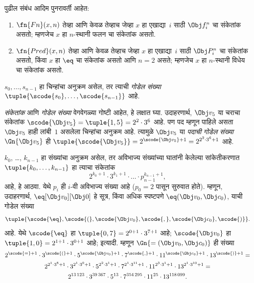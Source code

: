 \begin{prop}
पुढील संबंध आदिम पुनरावर्ती आहेत:
\begin{enumerate}
\item $\fn{Fn}(x, n)$ तेव्हा आणि केवळ तेव्हाच जेव्हा $x$ हा एखाद्या~$i$ साठी
  $\Obj f^n_i$ चा संकेतांक असतो; म्हणजेच $x$ हा $n$-स्थानी
  फलन चा संकेतांक असतो.
\item $\fn{Pred}(x, n)$ तेव्हा आणि केवळ तेव्हाच जेव्हा $x$ हा एखाद्या~$i$ साठी
  $\Obj P^n_i$ चा संकेतांक असतो, किंवा $x$ हा $\eq$ चा संकेतांक
  असतो आणि $n = 2$ असते; म्हणजेच $x$ हा $n$-स्थानी विधेय
  चा संकेतांक असतो.
\end{enumerate}
\end{prop}

\begin{defn}
$s_0, \dots, s_{n-1}$ हा चिन्हांचा अनुक्रम असेल, तर त्याची
\emph{गोडेल संख्या} $\tuple{\scode{s_0}, \dots, \scode{s_{n-1}}}$ आहे.
\end{defn}

\begin{explain}
\emph{संकेतांक} आणि \emph{गोडेल संख्या} वेगवेगळ्या गोष्टी आहेत,
हे लक्षात घ्या. उदाहरणार्थ, $\Obj v_5$ या चराचा संकेतांक
$\scode{\Obj v_5} = \tuple{1, 5} = 2^2\cdot 3^6$ आहे.
पण पद म्हणून पाहिले असता~$\Obj v_5$ हाही लांबी~$1$ असलेला
चिन्हांचा अनुक्रम आहे. त्यामुळे $\Obj v_5$ या \emph{पदाची}
\emph{गोडेल संख्या}~$\Gn{\Obj v_5}$ ही
$\tuple{\scode{\Obj v_5}} = 2^{\scode{\Obj v_5} + 1} =
2^{2^2\cdot 3^6 + 1}$ आहे.
\end{explain}

\begin{ex}
$k_0$, \dots, $k_{n-1}$ हा संख्यांचा अनुक्रम असेल, तर
अविभाज्य संख्यांच्या घातांनी केलेल्या सांकेतीकरणात
$\tuple{k_0, \dots, k_{n-1}}$ हा त्याचा संकेतांक
\[2^{k_0+1}\cdot3^{k_1+1}\cdot \dots \cdot p_{n-1}^{k_{n-1}+1},
\]
आहे, हे आठवा. येथे $p_i$ ही $i$-वी अविभाज्य संख्या आहे
($p_0 = 2$ पासून सुरुवात होते). म्हणून, उदाहरणार्थ,
$\eq[\Obj v_0][\Obj 0]$ हे सूत्र, किंवा अधिक स्पष्टपणे
${\eq}(\Obj v_0,\Obj c_0)$, याची गोडेल संख्या
\[\tuple{\scode{\eq},\scode{(},\scode{\Obj v_0},\scode{,}, \scode{\Obj
    c_0},\scode{)}}.
\]
आहे. येथे $\scode{\eq}$ हा $\tuple{0,7} = 2^{0+1}\cdot
3^{7+1}$ आहे; $\scode{\Obj v_0}$ हा $\tuple{1,0} = 2^{1+1}\cdot3^{0+1}$
आहे; इत्यादी. म्हणून $\Gn{=(\Obj v_0,\Obj c_0)}$ ही संख्या
\begin{multline*}
2^{\scode{=} + 1}\cdot 3^{\scode{(}+1}\cdot 5^{\scode{\Obj v_0}+1}
\cdot 7^{\scode{,} + 1} \cdot 11^{\scode{\Obj c_0}+1} \cdot
13^{\scode{)}+1} = \\
2^{2^1\cdot 3^8 + 1}\cdot 3^{2^1\cdot 3^9+1}\cdot 5^{2^2\cdot 3^1+1}
\cdot 7^{2^1\cdot 3^{11} + 1} \cdot 11^{2^3\cdot3^1+1} \cdot
13^{2^1\cdot3^{10}+1} = \\
2^{13\,123}\cdot 3^{39\,367}\cdot 5^{13}\cdot 7^{354\,295}\cdot11^{25}\cdot13^{118\,099}.
\end{multline*}
\end{ex}











